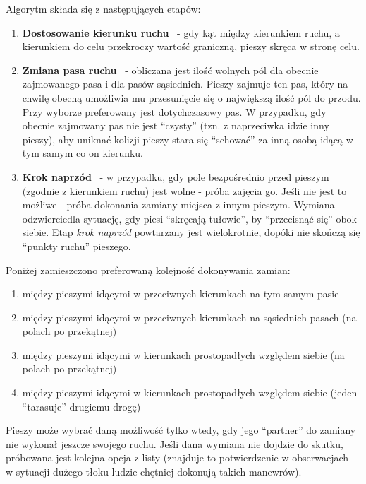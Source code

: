 \documentclass[a4paper, 12pt]{article}
\begin{document}
\noindent
Algorytm składa się z następujących etapów:
\begin{enumerate}
\item \textbf{Dostosowanie kierunku ruchu} \
    - gdy kąt między kierunkiem ruchu, a kierunkiem do celu przekroczy wartość graniczną, pieszy skręca w stronę celu.
\item \textbf{Zmiana pasa ruchu} \
    - obliczana jest ilość wolnych pól dla obecnie zajmowanego pasa i dla pasów sąsiednich. Pieszy zajmuje ten pas, który na chwilę obecną umożliwia mu przesunięcie się o największą ilość pól do przodu. Przy wyborze preferowany jest dotychczasowy pas. W przypadku, gdy obecnie zajmowany pas nie jest ``czysty'' (tzn. z naprzeciwka idzie inny pieszy), aby uniknać kolizji pieszy stara się ``schować'' za inną osobą idącą w tym samym co on kierunku.
\item \textbf{Krok naprzód} \
    - w przypadku, gdy pole bezpośrednio przed pieszym (zgodnie z kierunkiem ruchu) jest wolne - próba zajęcia go. Jeśli nie jest to możliwe - próba dokonania zamiany miejsca z innym pieszym. Wymiana odzwierciedla sytuację, gdy piesi ``skręcają tułowie'', by ``przecisnąć się'' obok siebie. Etap \textit{krok naprzód} powtarzany jest wielokrotnie, dopóki nie skończą się ``punkty ruchu'' pieszego.
\end{enumerate}

\newpage

\noindent
Poniżej zamieszczono preferowaną kolejność dokonywania zamian:

\begin{enumerate}
\item między pieszymi idącymi w przeciwnych kierunkach na tym samym pasie
\item między pieszymi idącymi w przeciwnych kierunkach na sąsiednich pasach (na polach po przekątnej)
\item między pieszymi idącymi w kierunkach prostopadłych względem siebie (na polach po przekątnej)
\item między pieszymi idącymi w kierunkach prostopadłych względem siebie (jeden ``tarasuje'' drugiemu drogę)
\end{enumerate}

\noindent
Pieszy może wybrać daną możliwość tylko wtedy, gdy jego ``partner'' do zamiany nie wykonał jeszcze swojego ruchu. Jeśli dana wymiana nie dojdzie do skutku, próbowana jest kolejna opcja z listy (znajduje to potwierdzenie w obserwacjach - w sytuacji dużego tłoku ludzie chętniej dokonują takich manewrów). \\
\end{document}
